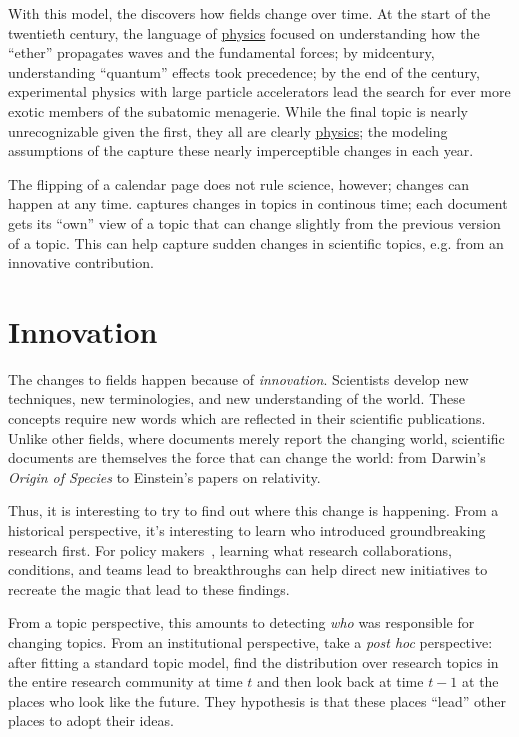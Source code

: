 With this model, the  discovers how fields change over
time.  At the start of the twentieth century, the language of
\underline{physics} focused on understanding how the ``ether''
propagates waves and the fundamental forces; by midcentury,
understanding ``quantum'' effects took precedence; by the end of the
century, experimental physics with large particle accelerators lead
the search for ever more exotic members of the subatomic menagerie.
While the final topic is nearly unrecognizable given the first, they
all are clearly \underline{physics}; the modeling assumptions of the
 capture these nearly imperceptible changes in each year.

The flipping of a calendar page does not rule science, however;
changes can happen at any time.  \citet{wang-08} captures changes in
topics in continous time; each document gets its ``own'' view of a
topic that can change slightly from the previous version of a topic.
This can help capture sudden changes in scientific topics, e.g. from
an innovative contribution.


\section{Innovation}

The changes to fields happen because of \emph{innovation}.  Scientists develop
new techniques, new terminologies, and new understanding of the world.  These
concepts require new words which are reflected in their scientific
publications.  Unlike other fields, where documents merely report the changing
world, scientific documents are themselves the force that can change the world:
from Darwin's \textit{Origin of Species} to Einstein's papers on relativity.

Thus, it is interesting to try to find out where this change is happening.  From
a historical perspective, it's interesting to learn who introduced
groundbreaking research first.  For policy makers~\citep{largent-12}, learning
what research collaborations, conditions, and teams lead to breakthroughs can
help direct new initiatives to recreate the magic that lead to these findings.

From a topic perspective, this amounts to detecting \emph{who} was responsible
for changing topics.  From an institutional perspective, \citet{ramage-10} take
a \textit{post hoc} perspective: after fitting a standard  topic model,
find the distribution over research topics in the entire research community at
time $t$ and then look back at time $t-1$ at the places who look like the
future.  They hypothesis is that these places ``lead'' other places to adopt
their ideas. %

